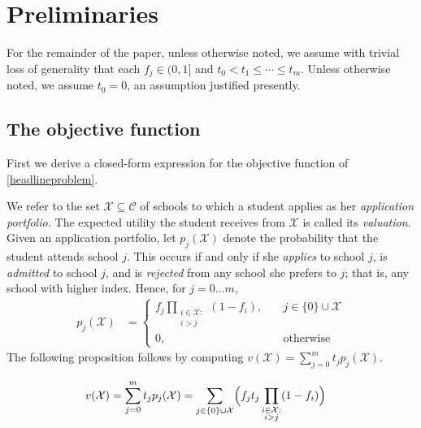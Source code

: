 \section{Preliminaries} \label{sectionModel}

For the remainder of the paper, unless otherwise noted, we assume with trivial loss of generality that each $f_j \in (0, 1]$ and $t_0 < t_1 \leq \cdots \leq t_m$. Unless otherwise noted, we assume $t_0 = 0$, an assumption justified presently. 

\subsection{The objective function} \label{sectionObjective}

First we derive a closed-form expression for the objective function of \eqref{headlineproblem}.

We refer to the set $\mathcal{X} \subseteq \mathcal{C}$ of schools to which a student applies as her \emph{application portfolio.} The expected utility the student receives from $\mathcal{X}$ is called its \emph{valuation}. Given an application portfolio, let $p_j(\mathcal{X})$ denote the probability that the student attends school $j$. This occurs if and only if she \emph{applies} to school $j$, is \emph{admitted} to school $j$, and is \emph{rejected} from any school she prefers to $j$; that is, any school with higher index. Hence, for $j= 0\dots m$,
\begin{align}
p_j(\mathcal{X}) &= 
\begin{cases}
\displaystyle f_j  \prod_{\substack{i \in \mathcal{X}: \\ i > j}} (1 - f_{i}), \quad & j \in \{0\}\cup\mathcal{X}\\
0, \quad & \text{otherwise}
\end{cases} 
\end{align}
The following proposition follows by computing $v(\mathcal{X}) = \sum_{j=0}^m  t_j p_j(\mathcal{X})$.
\begin{proposition}
\begin{align}
v(\mathcal{X}) &= \sum_{j=0}^m t_j p_j(\mathcal{X}) = \sum_{j\in\{0\}\cup\mathcal{X}} \Bigl( f_j t_j \prod_{\substack{i \in \mathcal{X}: \\ i > j}} (1 - f_{i}) \Bigr)  \label{closedformportfoliovaluationX}%
\end{align}
\end{proposition}

